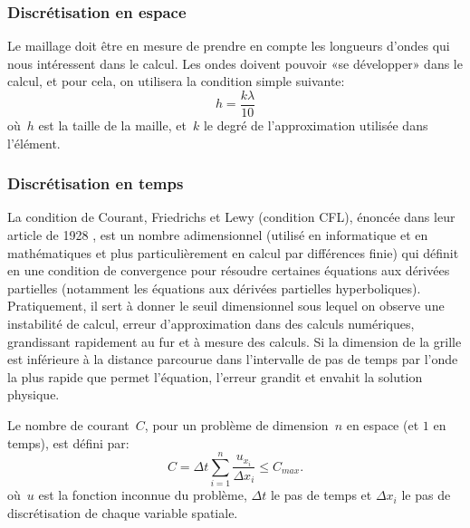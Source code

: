 \medskip
\subsubsection{Discrétisation en espace}
Le maillage doit être en mesure de prendre en compte les longueurs d'ondes qui nous intéressent dans le calcul. Les ondes doivent pouvoir «se développer» dans le calcul, et pour cela, on utilisera la condition simple suivante:
\begin{equation}
h=\dfrac{k\lambda}{10}
\end{equation}
où~$h$ est la taille de la maille, et~$k$ le degré de l'approximation utilisée dans l'élément.


\medskip
\subsubsection{Discrétisation en temps}

La condition de Courant, Friedrichs et Lewy (condition CFL), énoncée dans leur article de 1928 \cite{bib-CFL}, 
est un nombre adimensionnel (utilisé en informatique et en mathématiques et plus particulièrement en calcul par différences finie) qui définit en une condition de convergence pour résoudre certaines équations aux dérivées partielles (notamment les équations aux dérivées partielles hyperboliques). Pratiquement, il sert à donner le seuil dimensionnel sous lequel on observe une instabilité de calcul, erreur d'approximation dans des calculs numériques, grandissant rapidement au fur et à mesure des calculs. Si la dimension de la grille est inférieure à la distance parcourue dans l'intervalle de pas de temps par l'onde la plus rapide que permet l'équation, l'erreur grandit et envahit la solution physique.

\medskip
Le nombre de courant~$C$, pour un problème de dimension~$n$ en espace (et $1$ en temps), est défini par:
\begin{equation}
C = \Delta t \sum_{i=1}^n\frac{u_{x_i}}{\Delta x_i} \leq C_{max}. 
\end{equation}
où~$u$ est la fonction inconnue du problème, $\Delta t$ le pas de temps et $\Delta x_i$ le pas de discrétisation de chaque variable spatiale.

